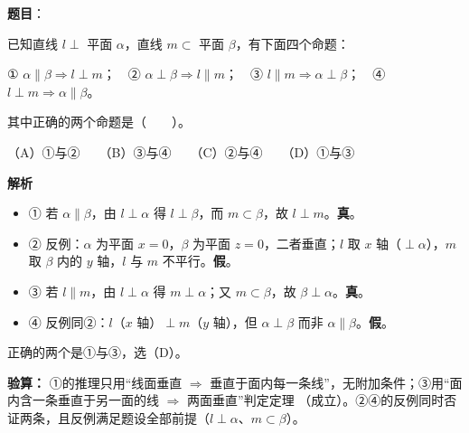 \begin{answer}

\textbf{题目}：

已知直线 $l\perp$ 平面 $\alpha$，直线 $m\subset$ 平面 $\beta$，有下面四个命题：

① $\alpha\parallel\beta\Rightarrow l\perp m$；　② $\alpha\perp\beta\Rightarrow l\parallel m$；　③ $l\parallel m\Rightarrow\alpha\perp\beta$；　④ $l\perp m\Rightarrow\alpha\parallel\beta$。

其中正确的两个命题是\mbox{（　　）}。

（A）①与②　　（B）③与④　　（C）②与④　　（D）①与③

\textbf{解析}

\begin{itemize}
\item ① 若 $\alpha\parallel\beta$，由 $l\perp\alpha$ 得 $l\perp\beta$，而 $m\subset\beta$，故 $l\perp m$。\textbf{真}。
\item ② 反例：$\alpha$ 为平面 $x=0$，$\beta$ 为平面 $z=0$，二者垂直；$l$ 取 $x$ 轴（$\perp\alpha$），$m$ 取 $\beta$ 内的 $y$ 轴，$l$ 与 $m$ 不平行。\textbf{假}。
\item ③ 若 $l\parallel m$，由 $l\perp\alpha$ 得 $m\perp\alpha$；又 $m\subset\beta$，故 $\beta\perp\alpha$。\textbf{真}。
\item ④ 反例同②：$l$（$x$ 轴）$\perp m$（$y$ 轴），但 $\alpha\perp\beta$ 而非 $\alpha\parallel\beta$。\textbf{假}。
\end{itemize}

正确的两个是①与③，选（D）。

\textbf{验算：} ①的推理只用“线面垂直 $\Rightarrow$ 垂直于面内每一条线”，无附加条件；③用“面内含一条垂直于另一面的线 $\Rightarrow$ 两面垂直”判定定理 （成立）。②④的反例同时否证两条，且反例满足题设全部前提（$l\perp\alpha$、$m\subset\beta$）。


\par\medskip

\end{answer}
